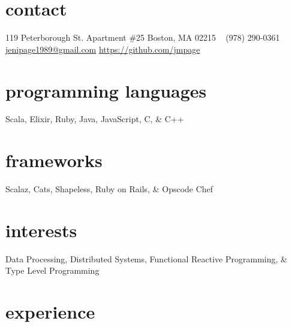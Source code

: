 \documentclass[]{friggeri-cv}
\begin{document}

\begin{aside} %
  \section{contact}
    119 Peterborough St.
    Apartment \#25
    Boston, MA 02215
    ~
    (978) 290-0361
    ~
    \hspace{-2ex}\href{mailto:jenipage1989@gmail.com}{jenipage1989@gmail.com}
    \hspace{-5ex}\href{https://github.com/jmpage}{https://github.com/jmpage}
  \section{programming languages}
    Scala, Elixir, Ruby, Java, JavaScript, C, \& C++
  \section{frameworks}
    Scalaz, Cats, Shapeless, Ruby on Rails, \& Opscode Chef
  \section{interests}
    Data Processing,
    Distributed Systems,
    Functional Reactive Programming, \& Type Level Programming
\end{aside}

\section{experience}
\end{document}
